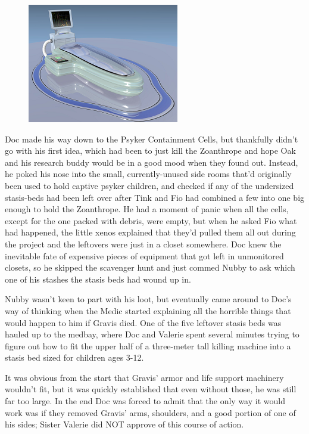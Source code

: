 \begin{figure}
	\begin{center}
		\includegraphics[width=\figwidth]{pics/15/32.png}
	\end{center}
\end{figure}
Doc made his way down to the Psyker Containment Cells, but thankfully didn't go with his first idea, which had been to just kill the Zoanthrope and hope Oak and his research buddy would be in a good mood when they found out. 
Instead, he poked his nose into the small, currently-unused side rooms that'd originally been used to hold captive psyker children, and checked if any of the undersized stasis-beds had been left over after Tink and Fio had combined a few into one big enough to hold the Zoanthrope. 
He had a moment of panic when all the cells, except for the one packed with debris, were empty, but when he asked Fio what had happened, the little xenos explained that they'd pulled them all out during the project and the leftovers were just in a closet somewhere. 
Doc knew the inevitable fate of expensive pieces of equipment that got left in unmonitored closets, so he skipped the scavenger hunt and just commed Nubby to ask which one of his stashes the stasis beds had wound up in.

Nubby wasn't keen to part with his loot, but eventually came around to Doc's way of thinking when the Medic started explaining all the horrible things that would happen to him if Gravis died. 
One of the five leftover stasis beds was hauled up to the medbay, where Doc and Valerie spent several minutes trying to figure out how to fit the upper half of a three-meter tall killing machine into a stasis bed sized for children ages 3-12.

It was obvious from the start that Gravis' armor and life support machinery wouldn't fit, but it was quickly established that even without those, he was still far too large. 
In the end Doc was forced to admit that the only way it would work was if they removed Gravis' arms, shoulders, and a good portion of one of his sides; 
Sister Valerie did NOT approve of this course of action.

